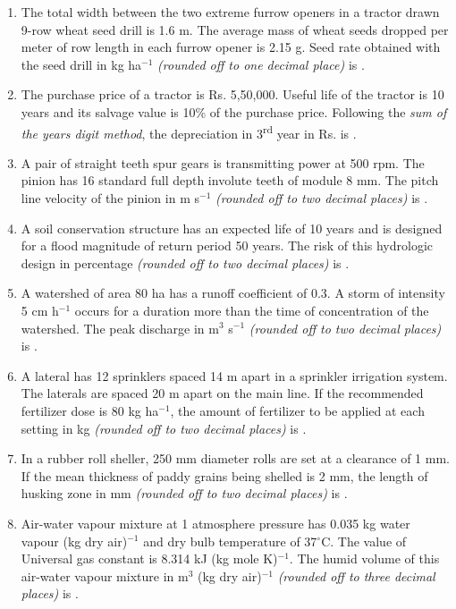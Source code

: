 \documentclass[12pt]{article}
\begin{document}
\begin{enumerate}[label=Q.\arabic*]
		\item The total width between the two extreme furrow openers in a tractor drawn 9-row wheat seed drill is 1.6 m. The average mass of wheat seeds dropped per meter of row length in each furrow opener is 2.15 g. Seed rate obtained with the seed drill in kg ha$^{-1}$ \textit{(rounded off to one decimal place)} is \underline{\hspace{2cm}}.
			\newpage
		\item The purchase price of a tractor is Rs. 5,50,000. Useful life of the tractor is 10 years and its salvage value is 10\% of the purchase price. Following the \textit{sum of the years digit method}, the depreciation in 3\textsuperscript{rd} year in Rs. is \underline{\hspace{2cm}}.

		\item A pair of straight teeth spur gears is transmitting power at 500 rpm. The pinion has 16 standard full depth involute teeth of module 8 mm. The pitch line velocity of the pinion in m s$^{-1}$ \textit{(rounded off to two decimal places)} is \underline{\hspace{2cm}}.

		\item A soil conservation structure has an expected life of 10 years and is designed for a flood magnitude of return period 50 years. The risk of this hydrologic design in percentage \textit{(rounded off to two decimal places)} is \underline{\hspace{2cm}}.

		\item A watershed of area 80 ha has a runoff coefficient of 0.3. A storm of intensity 5 cm h$^{-1}$ occurs for a duration more than the time of concentration of the watershed. The peak discharge in m$^3$ s$^{-1}$ \textit{(rounded off to two decimal places)} is \underline{\hspace{2cm}}.
		\item A lateral has 12 sprinklers spaced 14 m apart in a sprinkler irrigation system. The laterals are spaced 20 m apart on the main line. If the recommended fertilizer dose is 80 kg ha$^{-1}$, the amount of fertilizer to be applied at each setting in kg \textit{(rounded off to two decimal places)} is \underline{\hspace{2cm}}.

		\item In a rubber roll sheller, 250 mm diameter rolls are set at a clearance of 1 mm. If the mean thickness of paddy grains being shelled is 2 mm, the length of husking zone in mm \textit{(rounded off to two decimal places)} is \underline{\hspace{2cm}}.

		\item Air-water vapour mixture at 1 atmosphere pressure has 0.035 kg water vapour (kg dry air)$^{-1}$ and dry bulb temperature of 37$^\circ$C. The value of Universal gas constant is 8.314 kJ (kg mole K)$^{-1}$. The humid volume of this air-water vapour mixture in m$^3$ (kg dry air)$^{-1}$ \textit{(rounded off to three decimal places)} is \underline{\hspace{2cm}}.
	\end{enumerate}
\end{document}
